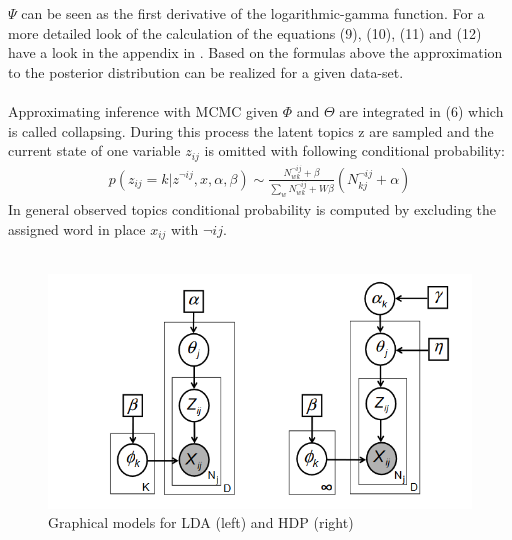 $\Psi$ can be seen as the first derivative of the logarithmic-gamma function. For a more detailed look of the calculation of the equations (9), (10), (11) and (12) have a look in the appendix in \citet{blei2003latent}. Based on the formulas above the approximation to the posterior distribution can be realized for a given data-set.
\\\\
Approximating inference with MCMC given $\Phi$ and $\Theta$ are integrated in (6) which is called collapsing. During this process the latent topics z are sampled and the current state of one variable $z_{ij}$ is omitted with following conditional probability:
\begin{align}
    p(z_{ij}=k|z^{\neg{ij}},x,\alpha,\beta)\sim\frac{N_{wk}^{\neg{ij}}+\beta}{\sum_wN_{wk}^{\neg{ij}}+W\beta}(N_{kj}^{\neg{ij}}+\alpha)
\end{align}
In general observed topics conditional probability is computed by excluding the assigned word in place \textit{$x_{ij}$} with $\neg{ij}$.
\\\\

\begin{figure}[h]
    \centering
    \includegraphics [width=\linewidth]{resources/LDAAndHDP.png}
    \caption{Graphical models for LDA (left) and HDP (right) \citet{newman2009distributed}}
    \label{fig:lda_hdp}
\end{figure}

